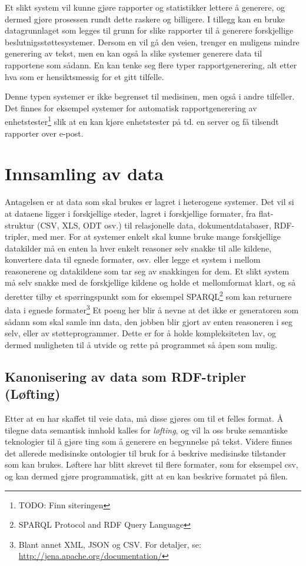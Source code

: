\documentclass[11pt]{article}
\begin{document}
Et slikt system vil kunne gjøre rapporter og statistikker lettere å generere, og dermed gjøre prosessen rundt dette raskere og billigere.
I tillegg kan en bruke datagrunnlaget som legges til grunn for slike rapporter til å generere forskjellige beslutnigsstøttesystemer. Dersom en vil gå den veien, trenger en muligens mindre generering av tekst, men en kan også la slike systemer generere data til rapportene som sådann. En kan tenke seg flere typer rapportgenerering, alt etter hva som er hensiktsmessig for et gitt tilfelle.

Denne typen systemer er ikke begrenset til medisinen, men også i andre tilfeller. Det finnes for eksempel systemer for automatisk rapportgenerering av enhetstester\footnote{TODO: Finn siteringen} slik at en kan kjøre enhetstester på td. en server og få tilsendt rapporter over e-post.

\section{Innsamling av data}
Antagelsen er at data som skal brukes er lagret i heterogene systemer.
Det vil si at dataene ligger i forskjellige steder, lagret i forskjellige formater, fra flat-struktur (CSV, XLS, ODT osv.) til relasjonelle data, dokumentdatabaser, RDF-tripler, med mer.
For at systemer enkelt skal kunne bruke mange forskjellige datakilder må en enten la hver enkelt reasoner selv snakke til alle kildene, konvertere data til egnede formater, osv. eller legge et system i mellom reasonerene og datakildene som tar seg av snakkingen for dem. Et slikt system må selv snakke med de forskjellige kildene og holde et mellomformat klart, og så deretter tilby et spørringspunkt som for eksempel SPARQL\footnote{SPARQL Protocol and RDF Query Language} som kan returnere data i egnede formater\footnote{Blant annet XML, JSON og CSV. For detaljer, se: \url{http://jena.apache.org/documentation/}}
Et poeng her blir å nevne at det ikke er generatoren som sådann som skal samle inn data, den jobben blir gjort av enten reasoneren i seg selv, eller av støtteprogrammer. Dette er for å holde kompleksiteten lav, og dermed muligheten til å utvide og rette på programmet så åpen som mulig.

\subsection{Kanonisering av data som RDF-tripler (Løfting)}
Etter at en har skaffet til veie data, må disse gjøres om til et felles format. Å tilegne data semantisk innhold kalles for \emph{løfting}, og vil la oss bruke semantiske teknologier til å gjøre ting som å generere en begynnelse på tekst.\cite{repgenmiakt} Videre finnes det allerede medisinske ontologier\cite{medont} til bruk for å beskrive medisinske tilstander som kan brukes.
Løftere har blitt skrevet til flere formater, som for eksempel csv\cite{tarql}, og kan dermed gjøre programmatisk, gitt at en kan beskrive formatet på filen.
\end{document}
